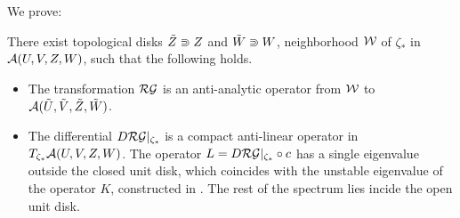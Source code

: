 We prove:
\begin{thm}\label{mainthm2} 
There exist topological disks $\tilde Z \Supset Z$ and $\tilde W \Supset W$,  neighborhood $\mathcal{W}$ of $\zeta_*$ in  $\mathcal{A}(U,V,Z,W)$,  such that the following holds.

\begin{itemize}
\item[$(i)$] The transformation $\mathcal{RG}$ is an anti-analytic operator from $\mathcal{W}$ to $\mathcal{A}(\tilde U,\tilde V,\tilde Z, \tilde W)$.
\item[$(ii)$] The differential $D \mathcal{RG}|_{\zeta_*}$ is a compact anti-linear operator in $T_{\zeta_*}\mathcal{A}(U,V,Z,W)$. The operator $L=D\mathcal{RG}|_{\zeta_*} \circ c$ has a single eigenvalue outside the closed unit disk, which coincides with the unstable eigenvalue of the operator $K$, constructed in . The rest of the spectrum lies incide the open unit disk.
\end{itemize}
\end{thm}

